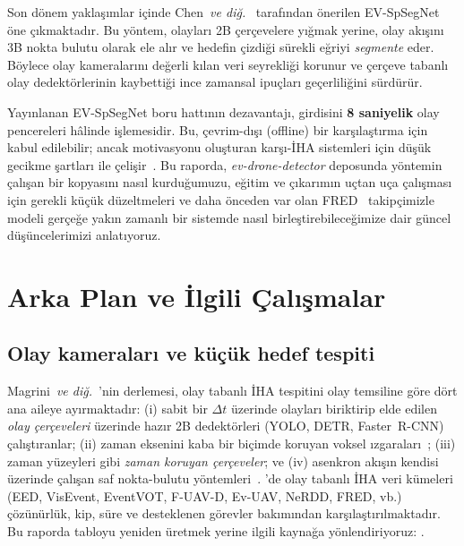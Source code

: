 \documentclass[11pt,a4paper]{article}
\begin{document}
Son d\"onem yakla\c{s}{\i}mlar i\c{c}inde
Chen~\textit{ve di\u{g}.}~\cite{chen2025evspsegnet} taraf{\i}ndan
\"onerilen EV-SpSegNet \"one \c{c}{\i}kmaktad{\i}r. Bu y\"ontem,
olaylar{\i} 2B \c{c}er\c{c}evelere y{\i}\u{g}mak yerine, olay ak{\i}\c{s}{\i}n{\i}
3B nokta bulutu olarak ele al{\i}r ve hedefin \c{c}izdi\u{g}i s\"urekli
e\u{g}riyi \emph{segmente} eder. B\"oylece olay kameralar{\i}n{\i}
de\u{g}erli k{\i}lan veri seyrekli\u{g}i korunur ve \c{c}er\c{c}eve
tabanl{\i} olay dedekt\"orlerinin kaybetti\u{g}i ince zamansal
ipu\c{c}lar{\i} ge\c{c}erlili\u{g}ini s\"urd\"ur\"ur.

Yay{\i}nlanan EV-SpSegNet boru hatt{\i}n{\i}n dezavantaj{\i},
girdisini \textbf{8 saniyelik} olay pencereleri h\^alinde
i\c{s}lemesidir. Bu, \c{c}evrim-d{\i}\c{s}{\i} (offline) bir kar\c{s}{\i}la\c{s}t{\i}rma
i\c{c}in kabul edilebilir; ancak motivasyonu olu\c{s}turan kar\c{s}{\i}-\.{I}HA
sistemleri i\c{c}in d\"u\c{s}\"uk gecikme \c{s}artlar{\i} ile
\c{c}eli\c{s}ir~\cite{magrini2025survey}. Bu raporda,
\emph{ev-drone-detector} deposunda y\"ontemin \c{c}al{\i}\c{s}an bir
kopyas{\i}n{\i} nas{\i}l kurdu\u{g}umuzu, e\u{g}itim ve \c{c}{\i}kar{\i}m{\i}n
u\c{c}tan u\c{c}a \c{c}al{\i}\c{s}mas{\i} i\c{c}in gerekli k\"u\c{c}\"uk
d\"uzeltmeleri ve daha \"onceden var olan FRED~\cite{magrini2025fred}
takip\c{c}imizle modeli ger\c{c}e\u{g}e yak{\i}n zamanl{\i} bir sistemde
nas{\i}l birle\c{s}tirebilece\u{g}imize dair g\"uncel
d\"u\c{s}\"uncelerimizi anlat{\i}yoruz.

\section{Arka Plan ve \.{I}lgili \c{C}al{\i}\c{s}malar}

\subsection{Olay kameralar{\i} ve k\"u\c{c}\"uk hedef tespiti}

Magrini~\textit{ve di\u{g}.}~\cite{magrini2025survey}'nin derlemesi,
olay tabanl{\i} \.{I}HA tespitini olay temsiline g\"ore d\"ort ana
aileye ay{\i}rmaktad{\i}r: (i) sabit bir $\Delta t$ \"uzerinde
olaylar{\i} biriktirip elde edilen \emph{olay \c{c}er\c{c}eveleri}
\"uzerinde haz{\i}r 2B dedekt\"orleri (YOLO, DETR, Faster~R-CNN)
\c{c}al{\i}\c{s}t{\i}ranlar; (ii) zaman eksenini kaba bir bi\c{c}imde
koruyan voksel {\i}zgaralar{\i}~\cite{gehrig2023rvt}; (iii) zaman
y\"uzeyleri gibi \emph{zaman koruyan \c{c}er\c{c}eveler}; ve (iv)
asenkron ak{\i}\c{s}{\i}n kendisi \"uzerinde \c{c}al{\i}\c{s}an saf
nokta-bulutu y\"ontemleri~\cite{chen2025evspsegnet,thomas2019kpconv,hu2020randla}.
\cite[Tab.~1]{magrini2025survey}'de olay tabanl{\i} \.{I}HA veri
k\"umeleri (EED, VisEvent, EventVOT, F-UAV-D, Ev-UAV, NeRDD, FRED,
vb.) \c{c}\"oz\"un\"url\"uk, kip, s\"ure ve desteklenen g\"orevler
bak{\i}m{\i}ndan kar\c{s}{\i}la\c{s}t{\i}r{\i}lmaktad{\i}r. Bu raporda
tabloyu yeniden \"uretmek yerine ilgili kayna\u{g}a y\"onlendiriyoruz:
\cite[Tab.~1]{magrini2025survey}.
\end{document}
